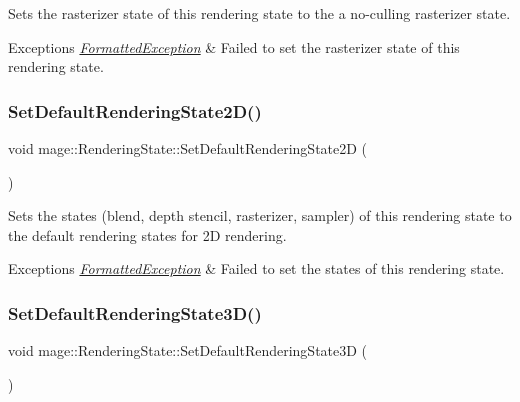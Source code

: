 Sets the rasterizer state of this rendering state to the a no-\/culling rasterizer state.


\begin{DoxyExceptions}{Exceptions}
{\em \hyperlink{structmage_1_1_formatted_exception}{Formatted\+Exception}} & Failed to set the rasterizer state of this rendering state. \\
\hline
\end{DoxyExceptions}
\hypertarget{structmage_1_1_rendering_state_aa8279c1177941c8f14502fc9c7296655}{}\label{structmage_1_1_rendering_state_aa8279c1177941c8f14502fc9c7296655} 
\subsubsection{\texorpdfstring{Set\+Default\+Rendering\+State2\+D()}{SetDefaultRenderingState2D()}}
{\footnotesize\ttfamily void mage\+::\+Rendering\+State\+::\+Set\+Default\+Rendering\+State2D (\begin{DoxyParamCaption}{ }\end{DoxyParamCaption})}

Sets the states (blend, depth stencil, rasterizer, sampler) of this rendering state to the default rendering states for 2D rendering.


\begin{DoxyExceptions}{Exceptions}
{\em \hyperlink{structmage_1_1_formatted_exception}{Formatted\+Exception}} & Failed to set the states of this rendering state. \\
\hline
\end{DoxyExceptions}
\hypertarget{structmage_1_1_rendering_state_ac6029d9fdc873317b97f60d59b88e7a7}{}\label{structmage_1_1_rendering_state_ac6029d9fdc873317b97f60d59b88e7a7} 
\subsubsection{\texorpdfstring{Set\+Default\+Rendering\+State3\+D()}{SetDefaultRenderingState3D()}}
{\footnotesize\ttfamily void mage\+::\+Rendering\+State\+::\+Set\+Default\+Rendering\+State3D (\begin{DoxyParamCaption}{ }\end{DoxyParamCaption})}

